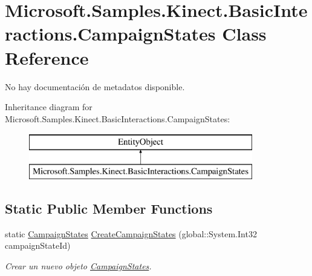 \hypertarget{class_microsoft_1_1_samples_1_1_kinect_1_1_basic_interactions_1_1_campaign_states}{\section{Microsoft.\-Samples.\-Kinect.\-Basic\-Interactions.\-Campaign\-States Class Reference}
\label{class_microsoft_1_1_samples_1_1_kinect_1_1_basic_interactions_1_1_campaign_states}
}


No hay documentación de metadatos disponible.  


Inheritance diagram for Microsoft.\-Samples.\-Kinect.\-Basic\-Interactions.\-Campaign\-States\-:\begin{figure}[H]
\begin{center}
\leavevmode
\includegraphics[height=2.000000cm]{class_microsoft_1_1_samples_1_1_kinect_1_1_basic_interactions_1_1_campaign_states}
\end{center}
\end{figure}
\subsection*{Static Public Member Functions}
\begin{DoxyCompactItemize}
\item 
static \hyperlink{class_microsoft_1_1_samples_1_1_kinect_1_1_basic_interactions_1_1_campaign_states}{Campaign\-States} \hyperlink{class_microsoft_1_1_samples_1_1_kinect_1_1_basic_interactions_1_1_campaign_states_a19ac3dda4a660461aff10ddf24aeed2d}{Create\-Campaign\-States} (global\-::\-System.\-Int32 campaign\-State\-Id)
\begin{DoxyCompactList}\small\item\em Crear un nuevo objeto \hyperlink{class_microsoft_1_1_samples_1_1_kinect_1_1_basic_interactions_1_1_campaign_states}{Campaign\-States}. \end{DoxyCompactList}\end{DoxyCompactItemize}
